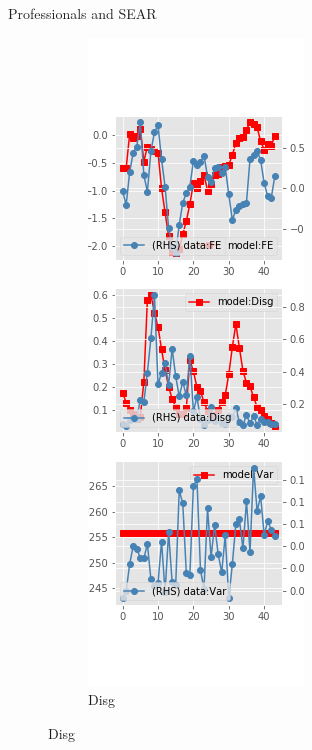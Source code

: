 \documentclass{beamer}
\begin{document}
\begin{frame}{Professionals and SEAR}
\begin{figure}[ht]
\begin{subfigure}[b]{0.2\textwidth}
		\end{subfigure}
		\hfill
		\begin{subfigure}[b]{0.2\textwidth}
			\caption{Disg}
			\includegraphics[width=\textwidth, height = 0.8\textheight]{figuresDraft/spf_se_est_diag1.png}

\end{subfigure}
\end{figure}
\end{frame}
\end{document}
